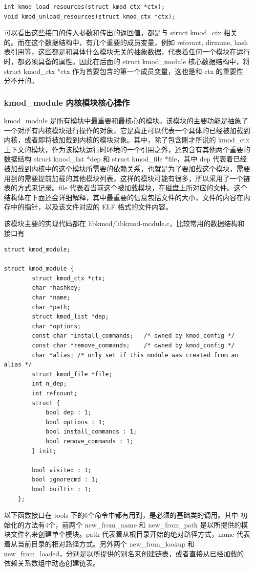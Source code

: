 \documentclass[11pt,a4paper]{article}
\begin{document}
{\begin{shaded}\begin{verbatim}
int kmod_load_resources(struct kmod_ctx *ctx);
void kmod_unload_resources(struct kmod_ctx *ctx);
\end{verbatim}\end{shaded}}
可以看出这些接口的传入参数和传出的返回值，都是与 struct kmod\_ctx
相关的。而在这个数据结构中，有几个重要的成员变量，例如 refcount, dirname,
hash表引用等，这些都是和具体什么模块无关的抽象数据，代表着任何一个模块在运行时，都必须具备的属性。因此在后面的
struct kmod\_module 核心数据结构中，将 struct kmod\_ctx *ctx
作为首要包含的第一个成员变量，这也是和 ctx 的重要性分不开的。

\subsubsection{kmod\_module 内核模块核心操作}

kmod\_module
是所有模块中最重要和最核心的模块。该模块的主要功能是抽象了一个对所有内核模块进行操作的对象，它是真正可以代表一个具体的已经被加载到内核，或者即将被加载到内核的模块对象。其中，除了包含刚才所说的
kmod\_ctx
上下文的模块，作为该模块运行时环境的一个引用之外，还包含有其他两个重要的数据结构
struct kmod\_list *dep 和 struct kmod\_file *file，其中 dep
代表着已经被加载到内核中的这个模块所需要的依赖关系，也就是为了要加载这个模块，需要用到的需要提前加载的其他模块列表，这样的模块可能有很多，所以采用了一个链表的方式来记录。file
代表着当前这个被加载模块，在磁盘上所对应的文件。这个结构体在下面还会详细解释，其中最重要的信息包括文件的大小，文件的内容在内存中的指针，以及该文件对应的
ELF 格式的文件内容。

该模块主要的实现代码都在
libkmod/libkmod-module.c，比较常用的数据结构和接口有

{\begin{shaded}\begin{verbatim}
struct kmod_module;

struct kmod_module {
        struct kmod_ctx *ctx;
        char *hashkey;
        char *name;
        char *path;
        struct kmod_list *dep;
        char *options;
        const char *install_commands;   /* owned by kmod_config */
        const char *remove_commands;    /* owned by kmod_config */
        char *alias; /* only set if this module was created from an alias */
        struct kmod_file *file;
        int n_dep;
        int refcount;
        struct {
            bool dep : 1;
            bool options : 1;
            bool install_commands : 1;
            bool remove_commands : 1;
        } init;

        bool visited : 1;
        bool ignorecmd : 1;
        bool builtin : 1;
    };
\end{verbatim}\end{shaded}}
以下函数接口在 tools 下的6个命令中都有用到，是必须的基础类的调用。其中
初始化的方法有4个，前两个 new\_from\_name 和 new\_from\_path
是以所提供的模块文件名来创建单个模块。path
代表着从根目录开始的绝对路径方式，name
代表着从当前目录的相对路径方式。另外两个 new\_from\_lookup 和
new\_from\_loaded，分别是以所提供的别名来创建链表，或者直接从已经加载的依赖关系数组中动态创建链表。
\end{document}
